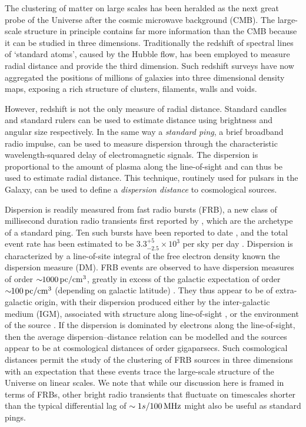 \documentclass[twocolumn,prl,floatfix]{revtex4-1}
\begin{document}
The clustering of matter on large scales has been
heralded as the next great probe of the Universe after the cosmic microwave
background (CMB). The large-scale structure in principle contains far more
information than the CMB because it can be studied in three dimensions.
Traditionally the redshift of spectral lines of `standard atoms', caused by the Hubble flow, has
been employed to measure radial distance and provide the third dimension.
Such redshift
surveys have now aggregated the positions of millions of galaxies into three
dimensional density maps, exposing a rich structure of clusters, filaments,
walls and voids.

However, redshift is not the only measure of radial distance. Standard
candles and standard rulers can be used to estimate distance using brightness
and angular size respectively.  In the same way a \emph{standard ping}, a brief
broadband radio impulse, can be used to measure dispersion through the
characteristic wavelength-squared delay of electromagnetic signals. The dispersion is
proportional to the amount of plasma along the
line-of-sight and can thus be used to estimate radial distance.
This technique, routinely used for
pulsars in the Galaxy, can be used to define a \emph{dispersion distance} to
cosmological sources.

Dispersion is readily measured from fast radio bursts (FRB),
a new class of millisecond duration radio transients first reported by
\citet{2007Sci...318..777L}, which are the archetype of a standard ping.
Ten such bursts have been reported to date
\citep{2012MNRAS.425L..71K,2013Sci...341...53T, 2014ApJ...790..101S,
2014ApJ...792...19B, 2015MNRAS.447..246P,2015ApJ...799L...5R}, and the total
event rate has been estimated to be $3.3^{+5}_{-2.5} \times 10^3$ per sky per
day \cite{2015arXiv150500834R}.
Dispersion is characterized by a line-of-site
integral of the free electron density known the dispersion measure (DM). FRB
events are observed to have dispersion measures of order $\sim\!\!1000\,{\rm pc}
/ {\rm cm}^3$, greatly in excess of the galactic expectation of order
$\sim\!\!100\,{\rm pc} / {\rm cm}^3$ (depending on galactic latitude)
\cite{2014arXiv1412.4829D}.  They thus appear to be of extra-galactic origin,
with their dispersion produced either by the inter-galactic medium (IGM),
associated with structure along line-of-sight \citep{2013Sci...341...53T},
or the environment of the
source \citep{2014ApJ...785L..26L,2015arXiv150101341P,2015arXiv150505535C}.  If
the dispersion is dominated by electrons along the line-of-sight, then the
average dispersion--distance relation can be modelled
\citep{2014ApJ...797...71Z,2004MNRAS.348..999I, 2003ApJ...598L..79I} and the
sources appear to be at cosmological distances of order gigaparsecs.
Such cosmological distances permit the study of the clustering of FRB sources in
three dimensions with an expectation that these events trace the large-scale
structure of the Universe on linear scales. We note that while our discussion
here is framed in terms of FRBs, other bright radio transients that fluctuate
on timescales shorter than the typical differential lag of $\sim 1s/100 \,{\rm
MHz} $ might also be useful as standard pings.
\end{document}
